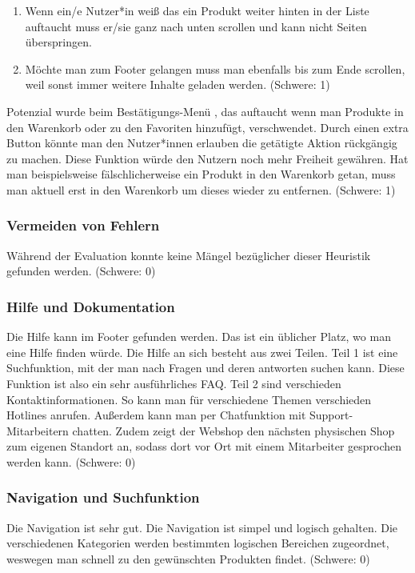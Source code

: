 \documentclass[utf8,biblatex]{lni}
\begin{document}
\begin{enumerate}
  \item Wenn ein/e Nutzer*in weiß das ein Produkt weiter hinten in der Liste auftaucht muss er/sie ganz nach unten scrollen und kann nicht Seiten überspringen.
  \item Möchte man zum Footer gelangen muss man ebenfalls bis zum Ende scrollen, weil sonst immer weitere Inhalte geladen werden. (Schwere: 1)
\end{enumerate}

Potenzial wurde beim Bestätigungs-Menü , das auftaucht wenn man Produkte in den Warenkorb oder zu den Favoriten hinzufügt, verschwendet. Durch einen extra Button könnte man den Nutzer*innen erlauben die getätigte Aktion rückgängig zu machen. Diese Funktion würde den Nutzern noch mehr Freiheit gewähren. Hat man beispielsweise fälschlicherweise ein Produkt in den Warenkorb getan, muss man aktuell erst in den Warenkorb um dieses wieder zu entfernen. (Schwere: 1)


\subsubsection*{Vermeiden von Fehlern}
Während der Evaluation konnte keine Mängel bezüglicher dieser Heuristik gefunden werden. (Schwere: 0)


\subsubsection*{Hilfe und Dokumentation}
Die Hilfe kann im Footer gefunden werden. Das ist ein üblicher Platz, wo man eine Hilfe finden würde. Die Hilfe an sich besteht aus zwei Teilen. Teil 1 ist eine Suchfunktion, mit der man nach Fragen und deren antworten suchen kann. Diese Funktion ist also ein sehr ausführliches FAQ. Teil 2 sind verschieden Kontaktinformationen. So kann man für verschiedene Themen verschieden Hotlines anrufen. Außerdem kann man per Chatfunktion mit Support-Mitarbeitern chatten. Zudem zeigt der Webshop den nächsten physischen Shop zum eigenen Standort an, sodass dort vor Ort mit einem Mitarbeiter gesprochen werden kann. (Schwere: 0)


\subsubsection*{Navigation und Suchfunktion}
Die Navigation ist sehr gut. Die Navigation ist simpel und logisch gehalten. Die verschiedenen Kategorien werden bestimmten logischen Bereichen zugeordnet, weswegen man schnell zu den gewünschten Produkten findet. (Schwere: 0)
\end{document}
